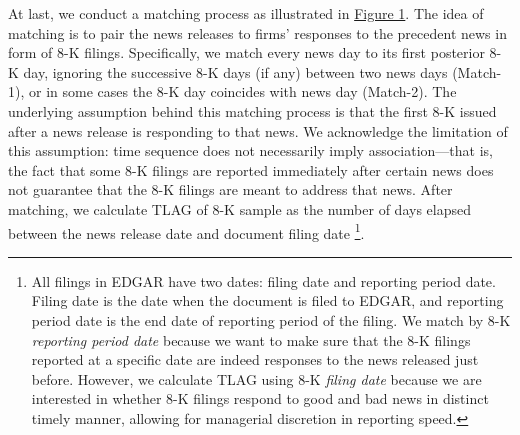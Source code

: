 \documentclass[a4paper]{article}
\begin{document}
\begin{spacing}{2}
At last, we conduct a matching process as illustrated in \hyperref[fig1]{Figure 1}. The idea of matching is to pair the news releases to firms' responses to the precedent news in form of 8-K filings. Specifically, we match every news day to its first posterior 8-K day, ignoring the successive 8-K days (if any) between two news days (Match-1), or in some cases the 8-K day coincides with news day (Match-2). The underlying assumption behind this matching process is that the first 8-K issued after a news release is responding to that news. We acknowledge the limitation of this assumption: time sequence does not necessarily imply association---that is, the fact that some 8-K filings are reported immediately after certain news does not guarantee that the 8-K filings are meant to address that news. %
After matching, we calculate TLAG of 8-K sample as the number of days elapsed between the news release date and document filing date \footnote{All filings in EDGAR have two dates: filing date and reporting period date. Filing date is the date when the document is filed to EDGAR, and reporting period date is the end date of reporting period of the filing. We match by 8-K \textit{reporting period date} because we want to make sure that the 8-K filings reported at a specific date are indeed responses to the news released just before. However, we calculate TLAG using 8-K \textit{filing date} because we are interested in whether 8-K filings respond to good and bad news in distinct timely manner, allowing for managerial discretion in reporting speed.}. 


\end{spacing}
\end{document}
